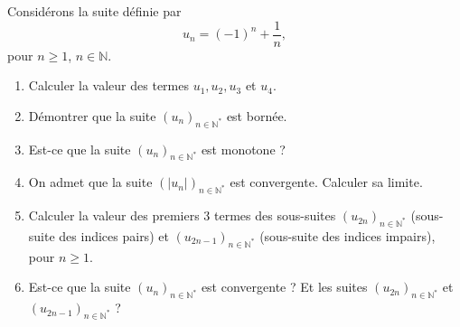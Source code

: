 
\begin{exercice}\label{exoDS2010-1-0005}

Considérons la suite définie par 
\begin{equation}
  u_n= (-1)^n+\frac{1}{n}, 
\end{equation}
pour $n\geq 1$, $n\in\mathbb{N}$.
 
\begin{enumerate}
\item Calculer la valeur des termes $u_1, u_2, u_3$ et $u_4$.
  \item Démontrer que la suite $(u_n)_{n\in\mathbb{N}^*}$ est bornée.
    \item Est-ce que la suite $(u_n)_{n\in\mathbb{N}^*}$ est monotone ? 
      \item On admet que la suite $(|u_n|)_{n\in\mathbb{N}^*}$ est convergente. Calculer sa limite.
        \item Calculer la valeur des premiers 3 termes des sous-suites $(u_{2n})_{n\in\mathbb{N}^*}$ (sous-suite des indices pairs) et $(u_{2n-1})_{n\in\mathbb{N}^*}$ (sous-suite des indices impairs), pour $n\geq 1$. 
          \item Est-ce que la suite $(u_n)_{n\in\mathbb{N}^*}$ est convergente ? Et les suites $(u_{2n})_{n\in\mathbb{N}^*}$  et $(u_{2n-1})_{n\in\mathbb{N}^*}$ ?
\end{enumerate}


\end{exercice}
